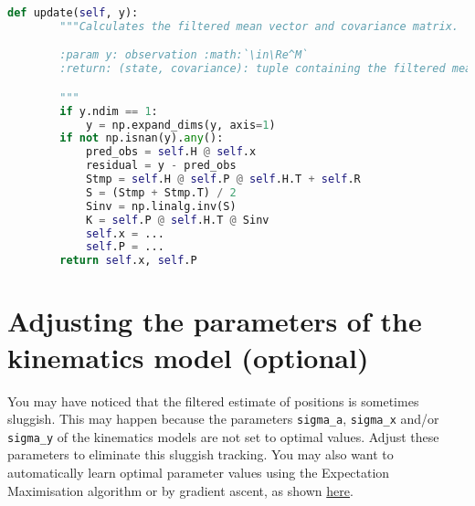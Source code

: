 \documentclass[12pt]{article}
\begin{document}
\begin{lstlisting}[caption={method \texttt{update} in class \texttt{OnlineKalmanFilter} in module \texttt{inference.py}},label={lst:update},language=python]
    def update(self, y):
        """Calculates the filtered mean vector and covariance matrix.

        :param y: observation :math:`\in\Re^M`
        :return: (state, covariance): tuple containing the filtered mean vector and covariance matrix.

        """
        if y.ndim == 1:
            y = np.expand_dims(y, axis=1)
        if not np.isnan(y).any():
            pred_obs = self.H @ self.x
            residual = y - pred_obs
            Stmp = self.H @ self.P @ self.H.T + self.R
            S = (Stmp + Stmp.T) / 2
            Sinv = np.linalg.inv(S)
            K = self.P @ self.H.T @ Sinv
            self.x = ...
            self.P = ...
        return self.x, self.P

\end{lstlisting}

\section{Adjusting the parameters of the kinematics model (optional)}

You may have noticed that the filtered estimate of positions is sometimes
sluggish. This may happen because the parameters \texttt{sigma\_a},
\texttt{sigma\_x} and/or \texttt{sigma\_y} of the kinematics models are not set
to optimal values. Adjust these parameters to eliminate this sluggish tracking.
You may also want to automatically learn optimal parameter values using the
Expectation Maximisation algorithm or by gradient ascent, as shown
\href{https://joacorapela.github.io/lds_python/auto_examples/tracking/plotEMvsGAcomparisonForagingMouse.html#sphx-glr-auto-examples-tracking-plotemvsgacomparisonforagingmouse-py}{here}.



\end{document}
